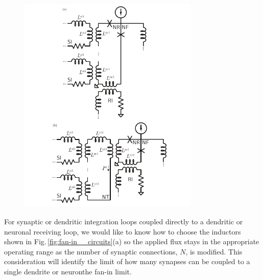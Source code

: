 \documentclass[twocolumn]{article}
\begin{document}
\begin{figure}[h!]
\includegraphics[width=8.6cm]{figures/_fig_apx__fan-in__circuits.pdf}
\end{figure}
For synaptic or dendritic integration loops coupled directly to a dendritic or neuronal receiving loop, we would like to know how to choose the inductors shown in Fig.\,\ref{fig:fan-in__circuits}(a) so the applied flux stays in the appropriate operating range as the number of synaptic connections, $N$, is modified. This consideration will identify the limit of how many synapses can be coupled to a single dendrite or neuron\textemdash the fan-in limit. 
\end{document}
